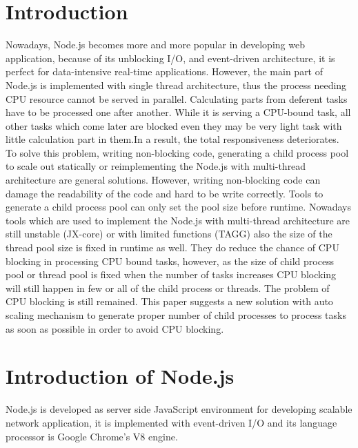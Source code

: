 \documentclass[JIP]{ipsj}
\begin{document}
\section{Introduction}
Nowadays, Node.js becomes more and more popular in developing web application, because of its unblocking I/O, and event-driven architecture, it is perfect for data-intensive real-time applications.
However, the main part of Node.js is implemented with single thread architecture, thus the process needing CPU resource cannot be served in parallel. Calculating parts from deferent tasks have to be processed one after another.
While it is serving a CPU-bound task, all other tasks which come later are blocked even they may be very light task with little calculation part in them.In a result, the total responsiveness deteriorates.
To solve this problem, writing non-blocking code, generating a child process pool to scale out statically or reimplementing the Node.js with multi-thread architecture are general solutions.
However, writing non-blocking code can damage the readability of the code and hard to be write correctly.
Tools to generate a child process pool can only set the pool size before runtime. 
Nowadays tools which are used to implement the Node.js with multi-thread architecture are still unstable (JX-core) or with limited functions (TAGG) also the size of the thread pool size is fixed in runtime as well.
They do reduce the chance of CPU blocking in processing CPU bound tasks, however, as the size of child process pool or thread pool is fixed when the number of tasks increases CPU blocking will still happen in few or all of the child process or threads. The problem of CPU blocking is still remained. 
This paper suggests a new solution with auto scaling mechanism to generate proper number of child processes to process tasks as soon as possible in order to avoid CPU blocking.

\section{Introduction of Node.js}
Node.js is developed as server side JavaScript environment for developing scalable network application, it is implemented with event-driven I/O and its language processor is Google Chrome's V8 engine.


\end{document}
